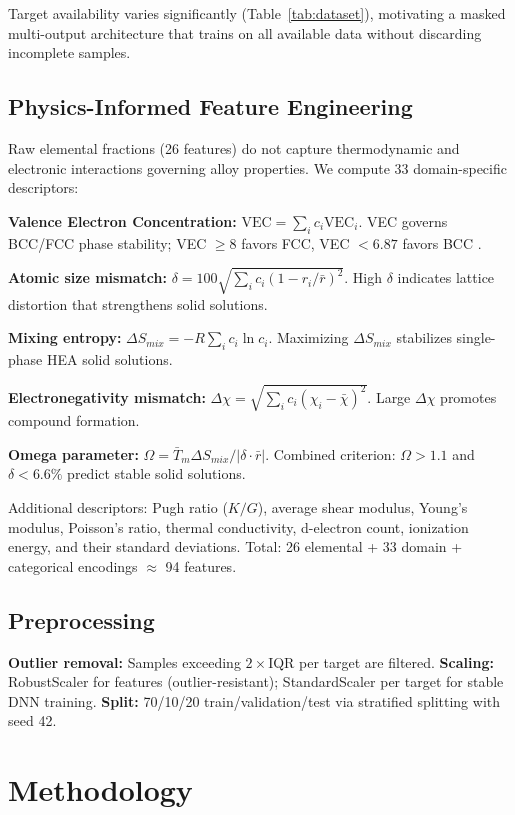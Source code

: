 \documentclass[conference]{IEEEtran}
\begin{document}
Target availability varies significantly (Table~\ref{tab:dataset}), motivating a masked multi-output architecture that trains on all available data without discarding incomplete samples.

\subsection{Physics-Informed Feature Engineering}
Raw elemental fractions (26 features) do not capture thermodynamic and electronic interactions governing alloy properties. We compute 33 domain-specific descriptors:

\textbf{Valence Electron Concentration:} $\text{VEC} = \sum_i c_i \text{VEC}_i$. VEC governs BCC/FCC phase stability; VEC $\geq 8$ favors FCC, VEC $< 6.87$ favors BCC \cite{b1}.

\textbf{Atomic size mismatch:} $\delta = 100\sqrt{\sum_i c_i(1-r_i/\bar{r})^2}$. High $\delta$ indicates lattice distortion that strengthens solid solutions.

\textbf{Mixing entropy:} $\Delta S_{mix} = -R\sum_i c_i \ln c_i$. Maximizing $\Delta S_{mix}$ stabilizes single-phase HEA solid solutions.

\textbf{Electronegativity mismatch:} $\Delta\chi = \sqrt{\sum_i c_i(\chi_i - \bar{\chi})^2}$. Large $\Delta\chi$ promotes compound formation.

\textbf{Omega parameter:} $\Omega = \bar{T}_m \Delta S_{mix} / |\delta \cdot \bar{r}|$. Combined criterion: $\Omega > 1.1$ and $\delta < 6.6\%$ predict stable solid solutions.

Additional descriptors: Pugh ratio ($K/G$), average shear modulus, Young's modulus, Poisson's ratio, thermal conductivity, d-electron count, ionization energy, and their standard deviations. Total: 26 elemental + 33 domain + categorical encodings $\approx$ 94 features.

\subsection{Preprocessing}
\textbf{Outlier removal:} Samples exceeding $2\times$IQR per target are filtered. \textbf{Scaling:} RobustScaler for features (outlier-resistant); StandardScaler per target for stable DNN training. \textbf{Split:} 70/10/20 train/validation/test via stratified splitting with seed 42.

\section{Methodology}
\end{document}
